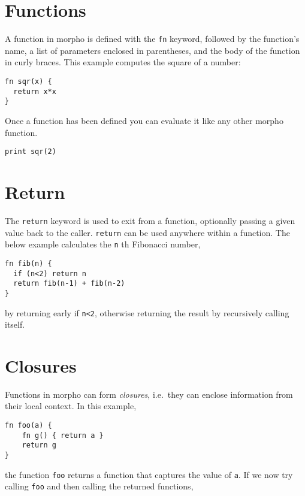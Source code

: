 \hypertarget{functions}{%
\section{Functions}\label{functions}}

A function in morpho is defined with the \texttt{fn} keyword, followed
by the function's name, a list of parameters enclosed in parentheses,
and the body of the function in curly braces. This example computes the
square of a number:

\begin{lstlisting}
fn sqr(x) {
  return x*x
}
\end{lstlisting}

Once a function has been defined you can evaluate it like any other
morpho function.

\begin{lstlisting}
print sqr(2)
\end{lstlisting}

\hypertarget{return}{%
\section{Return}\label{return}}

The \texttt{return} keyword is used to exit from a function, optionally
passing a given value back to the caller. \texttt{return} can be used
anywhere within a function. The below example calculates the \texttt{n}
th Fibonacci number,

\begin{lstlisting}
fn fib(n) {
  if (n<2) return n
  return fib(n-1) + fib(n-2)
}
\end{lstlisting}

by returning early if \texttt{n\textless{}2}, otherwise returning the
result by recursively calling itself.

\hypertarget{closures}{%
\section{Closures}\label{closures}}

Functions in morpho can form \emph{closures}, i.e.~they can enclose
information from their local context. In this example,

\begin{lstlisting}
fn foo(a) {
    fn g() { return a } 
    return g
}
\end{lstlisting}

the function \texttt{foo} returns a function that captures the value of
\texttt{a}. If we now try calling \texttt{foo} and then calling the
returned functions,

